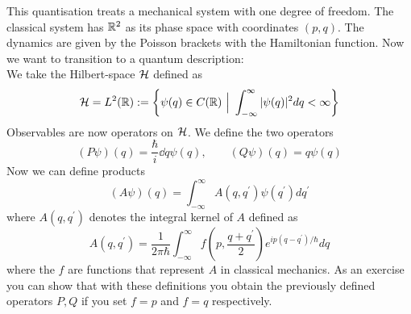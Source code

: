 \begin{example}
  This quantisation treats a mechanical system with one degree of freedom. The classical system has $\mathbb{R}^2$ as its phase space with coordinates $(p,q)$. The dynamics are given by the Poisson brackets with the Hamiltonian function. Now we want to transition to a quantum description:\\

  We take the Hilbert-space ${\mathcal{H}}$ defined as
  $$ {\mathcal{H}} = L^2(\mathbb{R}) := \left\{ \psi(q) \in C(\mathbb{R}) \ \Big| \ \int_{-\infty}^\infty |\psi(q)|^2 dq < \infty  \right\} $$
  Observables are now operators on ${\mathcal{H}}$. We define the two operators
  $$ (P\psi)(q) = \frac{\hbar}{i} \dd{}{q} \psi(q), \quad \quad (Q\psi)(q) = q \psi(q) $$
  Now we can define products
  $$ (A\psi)(q) = \int_{-\infty}^\infty A(q,q^\prime) \psi(q^\prime) dq^\prime $$
  where $A(q,q^\prime)$ denotes the integral kernel of $A$ defined as
  $$ A(q,q^\prime) = \frac{1}{2 \pi \hbar} \int_{-\infty}^\infty f\left( p, \frac{q+q^\prime}{2} \right) e^{ip(q-q^\prime)/\hbar} dq $$
  where the $f$ are functions that represent $A$ in classical mechanics. As an exercise you can show that with these definitions you obtain the previously defined operators $P,Q$ if you set $f=p$ and $f=q$ respectively.\\


\end{example}
